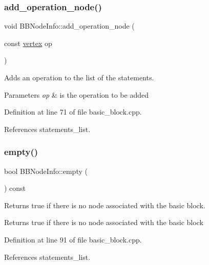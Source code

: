 \subsubsection{\texorpdfstring{add\+\_\+operation\+\_\+node()}{add\_operation\_node()}}
{\footnotesize\ttfamily void B\+B\+Node\+Info\+::add\+\_\+operation\+\_\+node (\begin{DoxyParamCaption}\item[{const \hyperlink{graph_8hpp_abefdcf0544e601805af44eca032cca14}{vertex}}]{op }\end{DoxyParamCaption})}



Adds an operation to the list of the statements. 


\begin{DoxyParams}{Parameters}
{\em op} & is the operation to be added \\
\hline
\end{DoxyParams}


Definition at line 71 of file basic\+\_\+block.\+cpp.



References statements\+\_\+list.

\mbox{\label{structBBNodeInfo_aecee6ebacff5a3995739e889c0a35c1a}} 
\subsubsection{\texorpdfstring{empty()}{empty()}}
{\footnotesize\ttfamily bool B\+B\+Node\+Info\+::empty (\begin{DoxyParamCaption}{ }\end{DoxyParamCaption}) const}



Returns true if there is no node associated with the basic block. 

\begin{DoxyReturn}{Returns}
true if there is no node associated with the basic block 
\end{DoxyReturn}


Definition at line 91 of file basic\+\_\+block.\+cpp.



References statements\+\_\+list.

\mbox{\label{structBBNodeInfo_a0b125a0b615083e9fe380beb78b0bd0e}} 
